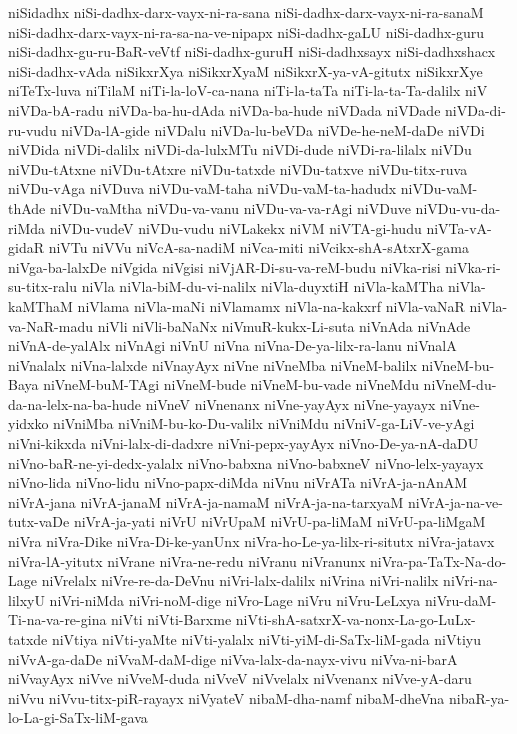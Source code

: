 {niSidadhx
niSi-dadhx-darx-vayx-ni-ra-sana
niSi-dadhx-darx-vayx-ni-ra-sanaM
niSi-dadhx-darx-vayx-ni-ra-sa-na-ve-nipapx
niSi-dadhx-gaLU
niSi-dadhx-guru
niSi-dadhx-gu-ru-BaR-veVtf
niSi-dadhx-guruH
niSi-dadhxsayx
niSi-dadhxshacx
niSi-dadhx-vAda
niSikxrXya
niSikxrXyaM
niSikxrX-ya-vA-gitutx
niSikxrXye
niTeTx-luva
niTilaM
niTi-la-loV-ca-nana
niTi-la-taTa
niTi-la-ta-Ta-dalilx
niV
niVDa-bA-radu
niVDa-ba-hu-dAda
niVDa-ba-hude
niVDada
niVDade
niVDa-di-ru-vudu
niVDa-lA-gide
niVDalu
niVDa-lu-beVDa
niVDe-he-neM-daDe
niVDi
niVDida
niVDi-dalilx
niVDi-da-lulxMTu
niVDi-dude
niVDi-ra-lilalx
niVDu
niVDu-tAtxne
niVDu-tAtxre
niVDu-tatxde
niVDu-tatxve
niVDu-titx-ruva
niVDu-vAga
niVDuva
niVDu-vaM-taha
niVDu-vaM-ta-hadudx
niVDu-vaM-thAde
niVDu-vaMtha
niVDu-va-vanu
niVDu-va-va-rAgi
niVDuve
niVDu-vu-da-riMda
niVDu-vudeV
niVDu-vudu
niVLakekx
niVM
niVTA-gi-hudu
niVTa-vA-gidaR
niVTu
niVVu
niVcA-sa-nadiM
niVca-miti
niVcikx-shA-sAtxrX-gama
niVga-ba-lalxDe
niVgida
niVgisi
niVjAR-Di-su-va-reM-budu
niVka-risi
niVka-ri-su-titx-ralu
niVla
niVla-biM-du-vi-nalilx
niVla-duyxtiH
niVla-kaMTha
niVla-kaMThaM
niVlama
niVla-maNi
niVlamamx
niVla-na-kakxrf
niVla-vaNaR
niVla-va-NaR-madu
niVli
niVli-baNaNx
niVmuR-kukx-Li-suta
niVnAda
niVnAde
niVnA-de-yalAlx
niVnAgi
niVnU
niVna
niVna-De-ya-lilx-ra-lanu
niVnalA
niVnalalx
niVna-lalxde
niVnayAyx
niVne
niVneMba
niVneM-balilx
niVneM-bu-Baya
niVneM-buM-TAgi
niVneM-bude
niVneM-bu-vade
niVneMdu
niVneM-du-da-na-lelx-na-ba-hude
niVneV
niVnenanx
niVne-yayAyx
niVne-yayayx
niVne-yidxko
niVniMba
niVniM-bu-ko-Du-valilx
niVniMdu
niVniV-ga-LiV-ve-yAgi
niVni-kikxda
niVni-lalx-di-dadxre
niVni-pepx-yayAyx
niVno-De-ya-nA-daDU
niVno-baR-ne-yi-dedx-yalalx
niVno-babxna
niVno-babxneV
niVno-lelx-yayayx
niVno-lida
niVno-lidu
niVno-papx-diMda
niVnu
niVrATa
niVrA-ja-nAnAM
niVrA-jana
niVrA-janaM
niVrA-ja-namaM
niVrA-ja-na-tarxyaM
niVrA-ja-na-ve-tutx-vaDe
niVrA-ja-yati
niVrU
niVrUpaM
niVrU-pa-liMaM
niVrU-pa-liMgaM
niVra
niVra-Dike
niVra-Di-ke-yanUnx
niVra-ho-Le-ya-lilx-ri-situtx
niVra-jatavx
niVra-lA-yitutx
niVrane
niVra-ne-redu
niVranu
niVranunx
niVra-pa-TaTx-Na-do-Lage
niVrelalx
niVre-re-da-DeVnu
niVri-lalx-dalilx
niVrina
niVri-nalilx
niVri-na-lilxyU
niVri-niMda
niVri-noM-dige
niVro-Lage
niVru
niVru-LeLxya
niVru-daM-Ti-na-va-re-gina
niVti
niVti-Barxme
niVti-shA-satxrX-va-nonx-La-go-LuLx-tatxde
niVtiya
niVti-yaMte
niVti-yalalx
niVti-yiM-di-SaTx-liM-gada
niVtiyu
niVvA-ga-daDe
niVvaM-daM-dige
niVva-lalx-da-nayx-vivu
niVva-ni-barA
niVvayAyx
niVve
niVveM-duda
niVveV
niVvelalx
niVvenanx
niVve-yA-daru
niVvu
niVvu-titx-piR-rayayx
niVyateV
nibaM-dha-namf
nibaM-dheVna
nibaR-ya-lo-La-gi-SaTx-liM-gava
}
